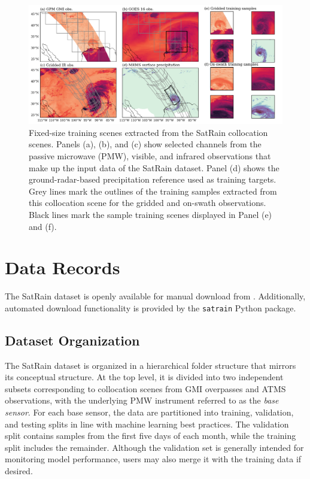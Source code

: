 \documentclass[11pt]{article}
\begin{document}
\begin{figure}[htbp] %
	\centering
	\includegraphics[width=1.0\textwidth]{figures/fig08}
	\caption{
		Fixed-size training scenes extracted from the SatRain collocation
		scenes. Panels (a), (b), and (c) show selected channels from the passive
		microwave (PMW), visible, and infrared observations that make up the
		input data of the SatRain dataset. Panel (d) shows the
		ground-radar-based precipitation reference used as training targets.
		Grey lines mark the outlines of the training samples extracted from this
		collocation scene for the gridded and on-swath observations. Black lines
		mark the sample training scenes displayed in Panel (e) and (f).
	}
	\label{fig:example_scenes}
\end{figure}


\section{Data Records}

The SatRain dataset is openly available for manual download from
\citep{SatRain2025}. Additionally, automated download functionality is provided
by the \texttt{satrain} \citep{SatRainPython2025} Python package.


\subsection{Dataset Organization}

The SatRain dataset is organized in a hierarchical folder structure that mirrors
its conceptual structure. At the top level, it is divided into two independent
subsets corresponding to collocation scenes from GMI overpasses and ATMS
observations, with the underlying PMW instrument referred to as the \textit{base sensor}.
For each base sensor, the data are partitioned into training, validation, and
testing splits in line with machine learning best practices. The validation
split contains samples from the first five days of each month, while the
training split includes the remainder. Although the validation set is generally
intended for monitoring model performance, users may also merge it with the
training data if desired.
\end{document}
